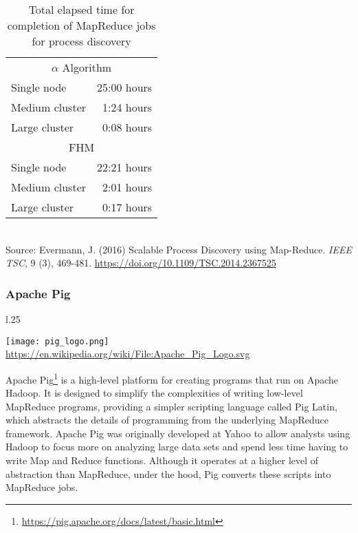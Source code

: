 \begin{table}
\centering

\begin{tabular}{lr} \hline
\multicolumn{2}{c}{$\alpha$ Algorithm} \\
Single node & 25:00 hours \\
Medium cluster & 1:24 hours \\
Large cluster & 0:08 hours \\ \hline
\multicolumn{2}{c}{FHM} \\
Single node & 22:21 hours\\
Medium cluster & 2:01 hours \\
Large cluster & 0:17 hours \\ \hline
\end{tabular} \\

\vspace{\baselineskip}
\scriptsize
Source: Evermann, J. (2016) Scalable Process Discovery using Map-Reduce. \emph{IEEE TSC}, 9 (3), 469-481. \footnotesize \url{https://doi.org/10.1109/TSC.2014.2367525}
\caption[MapReduce performance for process discovery]{Total elapsed time for completion of MapReduce jobs for process discovery}
\label{tab:processdiscoveryresults}
\end{table}

\FloatBarrier
\subsubsection*{Apache Pig}

\begin{wrapfigure}{l}{.25\textwidth}
\begin{center}
\texttt{[image: pig\_logo.png]} \\
\tiny\url{https://en.wikipedia.org/wiki/File:Apache_Pig_Logo.svg}
\end{center}
\end{wrapfigure}
Apache Pig\footnote{\url{https://pig.apache.org/docs/latest/basic.html}} is a high-level platform for creating programs that run on Apache Hadoop. It is designed to simplify the complexities of writing low-level MapReduce programs, providing a simpler scripting language called Pig Latin, which abstracts the details of programming from the underlying MapReduce framework. Apache Pig was originally developed at Yahoo to allow analysts using Hadoop to focus more on analyzing large data sets and spend less time having to write Map and Reduce functions. Although it operates at a higher level of abstraction than MapReduce, under the hood, Pig converts these scripts into MapReduce jobs.

